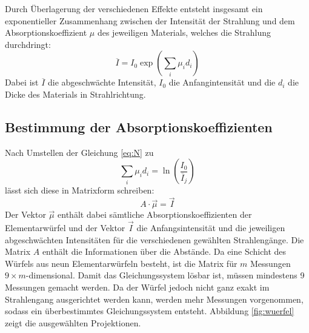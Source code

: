 Durch Überlagerung der verschiedenen Effekte entsteht insgesamt ein exponentieller Zusammenhang zwischen der Intensität der Strahlung und dem
Absorptionskoeffizient $\mu$ des jeweiligen Materials, welches die Strahlung durchdringt:
\begin{equation}
  \overline{I} = I_0 \exp\left( \sum_i \mu_i d_i \right)
  \label{eq:N}
\end{equation}
Dabei ist $\overline{I}$ die abgeschwächte Intensität, $I_0$ die Anfangintensität und die $d_i$ die Dicke des Materials in Strahlrichtung.

\subsection{Bestimmung der Absorptionskoeffizienten}
Nach Umstellen der Gleichung \eqref{eq:N} zu
\begin{equation}
  \sum_i\mu_i d_i = \ln\left(\frac{I_0}{\overline{I}_j}\right)
\end{equation}
lässt sich diese in Matrixform schreiben:
\begin{equation}
  A\cdot\vec{\mu} = \vec{I}
  \label{eqn:1}
\end{equation}
Der Vektor $\vec{\mu}$ enthält dabei sämtliche Absorptionskoeffizienten der Elementarwürfel und der Vektor $\vec{I}$ die Anfangsintensität und die jeweiligen abgeschwächten
Intensitäten für die verschiedenen gewählten Strahlengänge. Die Matrix $A$ enthält die Informationen über die Abstände. Da eine Schicht des Würfels aus
neun Elementarwürfeln besteht, ist die Matrix für $m$ Messungen $9\times m$-dimensional. Damit das Gleichungssystem lösbar ist, müssen mindestens 9
Messungen gemacht werden. Da der Würfel jedoch nicht ganz exakt im Strahlengang ausgerichtet werden kann, werden mehr Messungen vorgenommen, sodass ein
überbestimmtes Gleichungssystem entsteht. Abbildung \ref{fig:wuerfel} zeigt die ausgewählten Projektionen.

